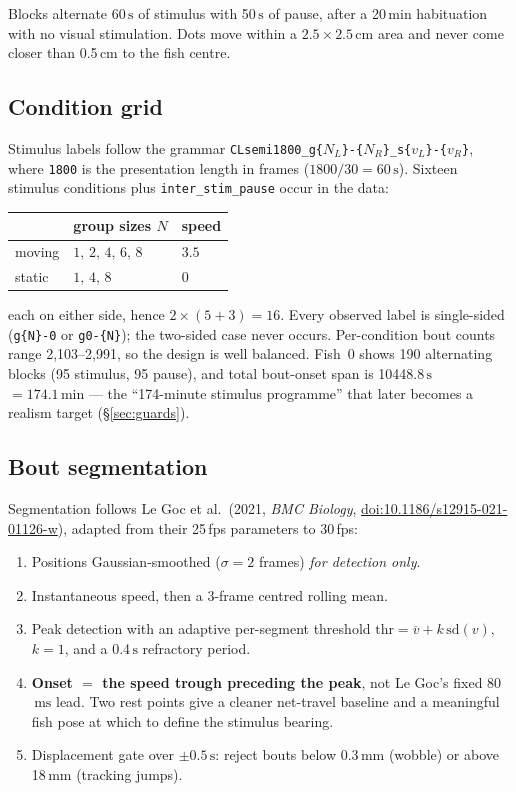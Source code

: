\documentclass[11pt,a4paper]{article}
\newcommand{\uu}[1]{\ensuremath{\,\mathrm{#1}}}  %
\newcommand{\code}[1]{\texttt{\small #1}}
\begin{document}
Blocks alternate 60\uu{s} of stimulus with 50\uu{s} of pause, after a
20\uu{min} habituation with no visual stimulation. Dots move within a
$2.5\times2.5$\,cm area and never come closer than 0.5\uu{cm} to the fish
centre.

\subsection{Condition grid}

Stimulus labels follow the grammar
\code{CLsemi1800\_g\{$N_L$\}-\{$N_R$\}\_s\{$v_L$\}-\{$v_R$\}}, where \code{1800} is the
presentation length in frames ($1800/30 = 60\uu{s}$). Sixteen stimulus conditions
plus \code{inter\_stim\_pause} occur in the data:

\begin{center}\small
\begin{tabular}{lll}
\toprule
& \textbf{group sizes $N$} & \textbf{speed} \\
\midrule
moving & $1,\,2,\,4,\,6,\,8$ & $3.5$ \\
static & $1,\,4,\,8$         & $0$   \\
\bottomrule
\end{tabular}
\end{center}

each on either side, hence $2\times(5+3)=16$. Every observed label is single-sided
(\code{g\{N\}-0} or \code{g0-\{N\}}); the two-sided case never occurs. Per-condition bout
counts range 2{,}103--2{,}991, so the design is well balanced. Fish~0 shows 190
alternating blocks (95 stimulus, 95 pause), and total bout-onset span is
10448.8\uu{s} $=174.1\uu{min}$ --- the ``174-minute stimulus programme''
that later becomes a realism target (\S\ref{sec:guards}).

\subsection{Bout segmentation}

Segmentation follows Le Goc et al.\ (2021, \emph{BMC Biology},
\href{https://doi.org/10.1186/s12915-021-01126-w}{doi:10.1186/s12915-021-01126-w}),
adapted from their 25\,fps parameters to 30\,fps:

\begin{enumerate}\itemsep1pt
\item Positions Gaussian-smoothed ($\sigma = 2$ frames) \emph{for detection only}.
\item Instantaneous speed, then a 3-frame centred rolling mean.
\item Peak detection with an adaptive per-segment threshold
      $\mathrm{thr} = \overline{v} + k\,\mathrm{sd}(v)$, $k=1$, and a
      0.4\uu{s} refractory period.
\item \textbf{Onset $=$ the speed trough preceding the peak}, not Le Goc's fixed
      80\uu{ms} lead. Two rest points give a cleaner net-travel baseline and
      a meaningful fish pose at which to define the stimulus bearing.
\item Displacement gate over $\pm0.5\uu{s}$: reject bouts below
      0.3\uu{mm} (wobble) or above 18\uu{mm} (tracking jumps).
\end{enumerate}
\end{document}
